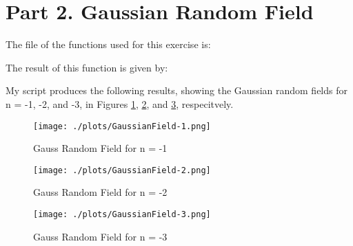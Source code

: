 \section{Part 2. Gaussian Random Field}

The file of the functions used for this exercise is:



The result of this function is given by:

My script produces the following results, showing the Gaussian random fields for n = -1, -2, and -3, in Figures \ref{fig:gauss1}, \ref{fig:gauss2}, and \ref{fig:gauss3}, respecitvely.



\begin{figure}[h!]
  \centering
  \texttt{[image: ./plots/GaussianField-1.png]}
  \caption{Gauss Random Field for n = -1}
  \label{fig:gauss1}
\end{figure}

\begin{figure}[h!]
  \centering
  \texttt{[image: ./plots/GaussianField-2.png]}
  \caption{Gauss Random Field for n = -2}
  \label{fig:gauss2}
\end{figure}

\begin{figure}[h!]
  \centering
  \texttt{[image: ./plots/GaussianField-3.png]}
  \caption{Gauss Random Field for n = -3}
  \label{fig:gauss3}
\end{figure}


